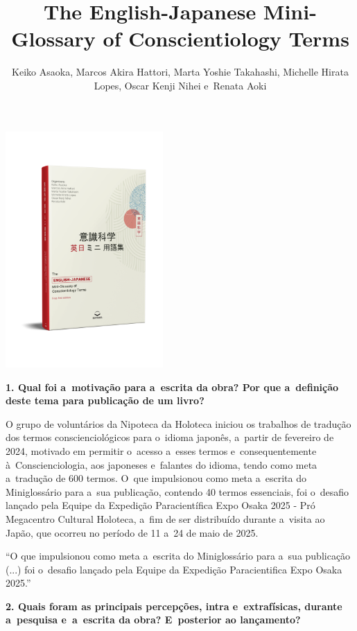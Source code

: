 \documentclass{gescons}
\author{Keiko Asaoka, Marcos Akira Hattori, Marta Yoshie Takahashi, Michelle Hirata Lopes, Oscar Kenji Nihei e~Renata Aoki}
\title{The English-Japanese Mini-Glossary of Conscientiology Terms}
\begin{document}
    \makeentrevistatitle

    \begin{multicols}{2}

\begin{center}
    \vspace{-0.5cm}
    \includegraphics[width=6cm]{articles/entrevista/mockups/Mini-Glossary.png}
\end{center}


\textbf{1. Qual foi a~motivação para a~escrita da obra? Por que a~definição deste tema para publicação de um livro?}

O grupo de voluntários da Nipoteca da Holoteca iniciou os trabalhos de tradução dos termos conscienciológicos para o~idioma japonês, a~partir de fevereiro de 2024, motivado em permitir o~acesso a~esses termos e~consequentemente à~Conscienciologia, aos japoneses e~falantes do idioma, tendo como meta a~tradução de 600 termos. O~que impulsionou como meta a~escrita do Miniglossário para a~sua publicação, contendo 40 termos essenciais, foi o~desafio lançado pela Equipe da Expedição Paracientífica Expo Osaka 2025 - Pró Megacentro Cultural Holoteca, a~fim de ser distribuído durante a~visita ao Japão, que ocorreu no período de 11 a~24 de maio de 2025.

\begin{pullquote}
    ``O que impulsionou como meta a~escrita do Miniglossário para a~sua publicação (...) foi o~desafio lançado pela Equipe da Expedição Paracientifica Expo Osaka 2025.''
\end{pullquote}

\textbf{2. Quais foram as principais percepções, intra e~extrafísicas, durante a~pesquisa e~a~escrita da obra? E~posterior ao lançamento?}



\end{multicols}
\end{document}
